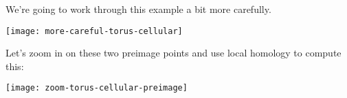 \begin{example}
	We're going to work through this example a bit more carefully.
	\begin{center}
		\texttt{[image: more-careful-torus-cellular]}
	\end{center}
	Let's zoom in on these two preimage points and use local homology to compute this:
	\begin{center}
		\texttt{[image: zoom-torus-cellular-preimage]}
	\end{center}
\end{example}